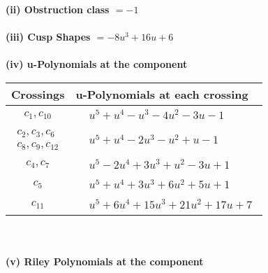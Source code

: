 \documentclass[1p]{elsarticle_modified}
\theoremstyle{definition}
\begin{document}
\flushleft \textbf{(ii) Obstruction class $= -1$}\\~\\
\flushleft \textbf{(iii) Cusp Shapes $= -8 u^3+16 u+6$}\\~\\
\newpage\renewcommand{\arraystretch}{1}
\flushleft \textbf{(iv) u-Polynomials at the component}\newline \\
\begin{tabular}{m{50pt}|m{274pt}}
Crossings & \hspace{64pt}u-Polynomials at each crossing \\
\hline $$\begin{aligned}c_{1},c_{10}\end{aligned}$$&$\begin{aligned}
&u^5+u^4- u^3-4 u^2-3 u-1
\end{aligned}$\\
\hline $$\begin{aligned}c_{2},c_{3},c_{6}\\c_{8},c_{9},c_{12}\end{aligned}$$&$\begin{aligned}
&u^5+u^4-2 u^3- u^2+u-1
\end{aligned}$\\
\hline $$\begin{aligned}c_{4},c_{7}\end{aligned}$$&$\begin{aligned}
&u^5-2 u^4+3 u^3+u^2-3 u+1
\end{aligned}$\\
\hline $$\begin{aligned}c_{5}\end{aligned}$$&$\begin{aligned}
&u^5+u^4+3 u^3+6 u^2+5 u+1
\end{aligned}$\\
\hline $$\begin{aligned}c_{11}\end{aligned}$$&$\begin{aligned}
&u^5+6 u^4+15 u^3+21 u^2+17 u+7
\end{aligned}$\\
\hline
\end{tabular}\\~\\
\newpage\renewcommand{\arraystretch}{1}
\flushleft \textbf{(v) Riley Polynomials at the component}\newline \\
\end{document}
